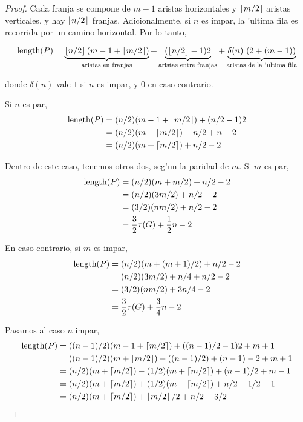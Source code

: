 \begin{theorem}
\begin{proof}
Cada franja se compone de $m - 1$ aristas horizontales y $\left\lceil m / 2 \right\rceil$ aristas verticales, y hay $\left\lfloor n / 2 \right\rfloor$ franjas. Adicionalmente, si $n$ es impar, la 'ultima fila es recorrida por un camino horizontal. Por lo tanto,

\[\textnormal{length}(P) = \underbrace{\left\lfloor n / 2 \right\rfloor(m - 1 + \left\lceil m / 2 \right\rceil)}_{\text{aristas en franjas}} + \underbrace{(\left\lfloor n / 2 \right\rfloor - 1)2}_{\text{aristas entre franjas}} + \underbrace{\delta(n) \text{ } (2 + (m - 1))}_{\text{aristas de la 'ultima fila}}\]

\noindent
donde $\delta(n)$ vale $1$ si $n$ es impar, y $0$ en caso contrario.

Si $n$ es par,
\begin{align*}
\textnormal{length}(P) &= (n / 2)(m - 1 + \left\lceil m / 2 \right\rceil) + (n / 2 - 1)2\\
&= (n / 2)(m + \left\lceil m / 2 \right\rceil) - n / 2 + n - 2\\
&= (n / 2)(m + \left\lceil m / 2 \right\rceil) + n / 2 - 2 
\end{align*}

\noindent
Dentro de este caso, tenemos otros dos, seg'un la paridad de $m$. Si $m$ es par,
\begin{align*}
\textnormal{length}(P) &= (n / 2)(m + m / 2) + n / 2 - 2\\
&= (n / 2)(3m / 2) + n / 2 - 2\\
&= (3 / 2)(nm / 2) + n / 2 - 2\\
&= \frac{3}{2} \tau(G) + \frac{1}{2} n - 2
\end{align*}

\noindent
En caso contrario, si $m$ es impar,
\begin{align*}
\textnormal{length}(P) &= (n / 2)(m + (m + 1) / 2) + n / 2 - 2\\
&= (n / 2)(3m / 2) + n / 4 +  n / 2 - 2\\
&= (3 / 2)(nm / 2) + 3n / 4 - 2\\
&= \frac{3}{2} \tau(G) + \frac{3}{4}n - 2
\end{align*}

Pasamos al caso $n$ impar,
\begin{align*}
\textnormal{length}(P) &= ((n - 1) / 2)(m - 1 + \left\lceil m / 2 \right\rceil) + ((n - 1) / 2 - 1)2 + m + 1\\
&= ((n - 1) / 2)(m + \left\lceil m / 2 \right\rceil) - ((n - 1) / 2) + (n - 1) - 2 + m + 1\\
&= (n / 2)(m + \left\lceil m / 2 \right\rceil) - (1 / 2)(m + \left\lceil m / 2 \right\rceil) + (n - 1) / 2 + m - 1\\
&= (n / 2)(m + \left\lceil m / 2 \right\rceil) + (1 / 2)(m - \left\lceil m / 2 \right\rceil) + n / 2 - 1 / 2 - 1\\
&= (n / 2)(m + \left\lceil m / 2 \right\rceil) + \left\lfloor m / 2 \right\rfloor / 2 + n / 2 - 3 / 2
\end{align*}


\end{proof}
\end{theorem}
